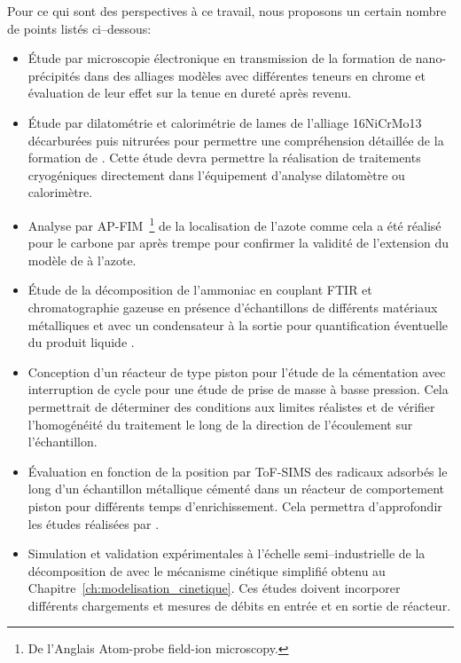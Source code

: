 Pour ce qui sont des perspectives à ce travail, nous proposons un certain nombre de points listés ci--dessous:
\begin{itemize}
  \item Étude par microscopie électronique en transmission de la formation de nano-précipités dans des alliages modèles  avec différentes teneurs en chrome et évaluation de leur effet sur la tenue en dureté après revenu.

  \item Étude par dilatométrie et calorimétrie de lames de l'alliage 16NiCrMo13 décarburées puis nitrurées pour permettre une compréhension détaillée de la formation de . Cette étude devra permettre la réalisation de traitements cryogéniques directement dans l'équipement d'analyse \textemdash{} dilatomètre ou calorimètre. 
  
  \item Analyse par AP-FIM~\footnote{De l'Anglais Atom-probe field-ion microscopy.} de la localisation de l'azote \textendash{} comme cela a été réalisé pour le carbone par \citet{Hutchinson20115845} \textendash{} après trempe pour confirmer la validité de l'extension du modèle de \citet{Norstrom1976} à l'azote.
  
  \item Étude de la décomposition de l'ammoniac en couplant FTIR et chromatographie gazeuse en présence d'échantillons de différents matériaux métalliques et avec un condensateur à la sortie pour quantification éventuelle du produit liquide .
  
  \item Conception d'un réacteur de type piston pour l'étude de la cémentation avec interruption de cycle pour une étude de prise de masse à basse pression. Cela permettrait de déterminer des conditions aux limites réalistes et de vérifier l'homogénéité du traitement le long de la direction de l'écoulement sur l'échantillon.

  \item Évaluation en fonction de la position par ToF-SIMS des radicaux adsorbés le long d'un échantillon métallique cémenté dans un réacteur de comportement piston pour différents temps d'enrichissement. Cela permettra d'approfondir les études réalisées par \citet{Kula2005}.
  
  \item Simulation et validation expérimentales à l'échelle semi--industrielle de la décomposition de  avec le mécanisme cinétique simplifié obtenu au Chapitre~\ref{ch:modelisation_cinetique}. Ces études doivent incorporer différents chargements et mesures de débits en entrée et en sortie de réacteur.
\end{itemize}

\endinput